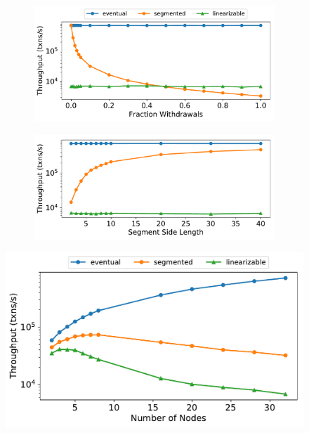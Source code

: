 \begin{figure}[ht]
  \centering

  \begin{subfigure}[c]{\columnwidth}
    \centering
    \includegraphics[width=\columnwidth]{figures/vary_withdraws.pdf}
  \end{subfigure}
  \begin{subfigure}[c]{\columnwidth}
    \includegraphics[width=\columnwidth]{figures/vary_segments.pdf}
  \end{subfigure}

  \caption{}\figlabel{}
\end{figure}

\begin{figure}[ht]
  \centering
  \includegraphics[width=\columnwidth]{figures/vary_nodes.pdf}
  \caption{}\figlabel{}
\end{figure}

\printlength{\columnwidth}
